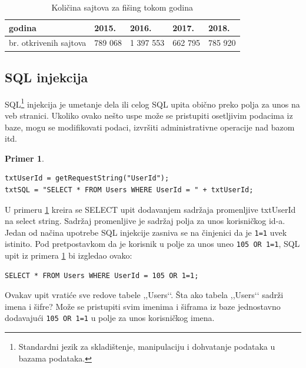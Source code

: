 \documentclass[a4paper]{article}
\theoremstyle{break}
\newtheorem{primer}{Primer}[section]
\begin{document}
{\begin{table}[h!]
\begin{center}
\caption{Količina sajtova za fišing tokom godina}
\begin{tabular}{|l||l|l|l|l|} \hline
godina                  & 2015. & 2016. & 2017. & 2018.\\ \hline
br. otkrivenih sajtova  & 789 068 & 1 397 553& 662 795& 785 920\\ \hline
\end{tabular}
\label{tab:tabela1}
\end{center}
\end{table}



\subsection{SQL injekcija}
\label{subsec:sql}

SQL\footnote{Standardni jezik za skladištenje, manipulaciju i dohvatanje podataka u bazama podataka.} injekcija je umetanje dela ili celog SQL upita obično preko polja za unos na veb stranici. Ukoliko ovako nešto uspe može se pristupiti osetljivim podacima iz baze, mogu se modifikovati podaci, izvršiti administrativne operacije nad bazom itd. 

\begin{primer}
\label{primer_1}
\begin{lstlisting}[frame=single]
txtUserId = getRequestString("UserId");
txtSQL = "SELECT * FROM Users WHERE UserId = " + txtUserId;
\end{lstlisting}
\end{primer}
\noindent U primeru \ref{primer_1} kreira se SELECT upit dodavanjem sadržaja promenljive txtUserId na select string. Sadržaj promenljive je sadržaj polja za unos korisničkog id-a.\\

Jedan od načina upotrebe SQL injekcije zasniva se na činjenici da je \texttt{1=1} uvek istinito. Pod pretpostavkom da je korisnik u polje za unos uneo \texttt{105 OR 1=1}, SQL upit iz primera \ref{primer_1} bi izgledao ovako:

\begin{lstlisting}[frame=single]
SELECT * FROM Users WHERE UserId = 105 OR 1=1;
\end{lstlisting}
\noindent Ovakav upit vratiće sve redove tabele ,,Users‘‘. Šta ako tabela ,,Users‘‘ sadrži imena i šifre? Može se pristupiti svim imenima i šiframa iz baze jednostavno dodavajući \texttt{105 OR 1=1} u polje za unos korisničkog imena.\\

}
\end{document}
